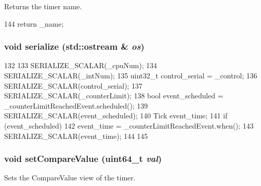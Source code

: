 Returns the timer name. 


\begin{DoxyCode}
144 { return _name; }
\end{DoxyCode}
\hypertarget{classGenericTimer_1_1ArchTimer_a53e036786d17361be4c7320d39c99b84}{
\subsubsection[{serialize}]{\setlength{\rightskip}{0pt plus 5cm}void serialize (std::ostream \& {\em os})}}
\label{classGenericTimer_1_1ArchTimer_a53e036786d17361be4c7320d39c99b84}



\begin{DoxyCode}
132 {
133     SERIALIZE_SCALAR(_cpuNum);
134     SERIALIZE_SCALAR(_intNum);
135     uint32_t control_serial = _control;
136     SERIALIZE_SCALAR(control_serial);
137     SERIALIZE_SCALAR(_counterLimit);
138     bool event_scheduled = _counterLimitReachedEvent.scheduled();
139     SERIALIZE_SCALAR(event_scheduled);
140     Tick event_time;
141     if (event_scheduled) {
142         event_time = _counterLimitReachedEvent.when();
143         SERIALIZE_SCALAR(event_time);
144     }
145 }
\end{DoxyCode}
\hypertarget{classGenericTimer_1_1ArchTimer_aa636bac63879171a06c4b39782c84e66}{
\subsubsection[{setCompareValue}]{\setlength{\rightskip}{0pt plus 5cm}void setCompareValue (uint64\_\-t {\em val})}}
\label{classGenericTimer_1_1ArchTimer_aa636bac63879171a06c4b39782c84e66}


Sets the CompareValue view of the timer. 


